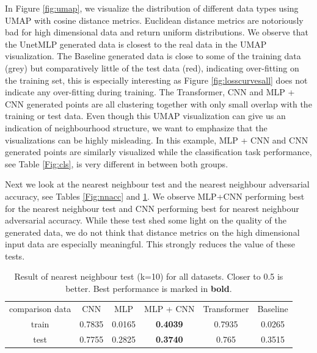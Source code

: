 In Figure \ref{fig:umap}, we visualize the distribution of different data types using UMAP \citep{UMAP} with cosine distance metrics. Euclidean distance metrics are notoriously bad for high dimensional data and return uniform distributions.
We observe that the UnetMLP generated data is closest to the real data in the UMAP visualization. 
The Baseline generated data is close to some of the training data (grey) but comparatively little of the test data (red), indicating over-fitting on the training set, this is especially interesting as Figure \ref{fig:losscurvesall} does not indicate any over-fitting during training.
The Transformer, CNN and MLP + CNN generated points are all clustering together with only small overlap with the training or test data.
Even though this UMAP visualization can give us an indication of neighbourhood structure, we want to emphasize that the visualizations can be highly misleading. In this example, MLP + CNN and CNN generated points are similarly visualized while the classification task performance, see Table \ref{Fig:cls}, is very different in between both groups. 



Next we look at the nearest neighbour test and the nearest neighbour adversarial accuracy, see Tables \ref{Fig:nnacc} and \ref{Fig:nntest}. We observe MLP+CNN performing best for the nearest neighbour test and CNN performing best for nearest neighbour adversarial accuracy. While these test shed some light on the quality of the generated data, we do not think that distance metrics on the high dimensional input data are especially meaningful. This strongly reduces the value of these tests.


\begin{table}
  \centering
  \caption{Result of nearest neighbour test (k=10) for all datasets. Closer to 0.5 is better. Best performance is marked in \textbf{bold}.}
  \label{Fig:nntest}
  \begin{tabular}{c|ccccc}
    \toprule
comparison data &  CNN & MLP & MLP + CNN &Transformer & Baseline \\
   \cmidrule(r){1-6} 
train & 0.7835 & 0.0165 & \textbf{0.4039} & 0.7935 & 0.0265  \\
test &  0.7755 & 0.2825 & \textbf{0.3740} & 0.765 & 0.3515 \\


    \bottomrule
  \end{tabular}
\end{table}

